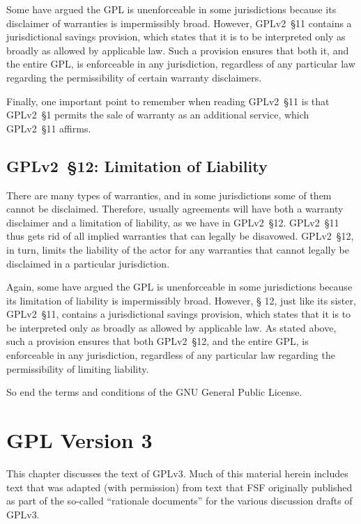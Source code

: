 Some have argued the GPL is unenforceable in some jurisdictions because
its disclaimer of warranties is impermissibly broad.  However, GPLv2~\S11
contains a jurisdictional savings provision, which states that it is to be
interpreted only as broadly as allowed by applicable law.  Such a
provision ensures that both it, and the entire GPL, is enforceable in any
jurisdiction, regardless of any particular law regarding the
permissibility of certain warranty disclaimers.

Finally, one important point to remember when reading GPLv2~\S11 is that GPLv2~\S1
permits the sale of warranty as an additional service, which GPLv2~\S11 affirms.

\section{GPLv2~\S12: Limitation of Liability}
\label{GPLv2s12}

There are many types of warranties, and in some jurisdictions some of them
cannot be disclaimed.  Therefore, usually agreements will have both a
warranty disclaimer and a limitation of liability, as we have in GPLv2~\S12.
GPLv2~\S11 thus gets rid of all implied warranties that can legally be
disavowed. GPLv2~\S12, in turn, limits the liability of the actor for any
warranties that cannot legally be disclaimed in a particular jurisdiction.

Again, some have argued the GPL is unenforceable in some jurisdictions
because its limitation of liability is impermissibly broad. However, \S
12, just like its sister, GPLv2~\S11, contains a jurisdictional savings
provision, which states that it is to be interpreted only as broadly as
allowed by applicable law.  As stated above, such a provision ensures that
both GPLv2~\S12, and the entire GPL, is enforceable in any jurisdiction,
regardless of any particular law regarding the permissibility of limiting
liability.

So end the terms and conditions of the GNU General Public License.

\chapter{GPL Version 3}
\label{GPLv3}

This chapter discusses the text of GPLv3.  Much of this material herein
includes text that was adapted (with permission) from text that FSF
originally published as part of the so-called ``rationale documents'' for the
various discussion drafts of GPLv3.

